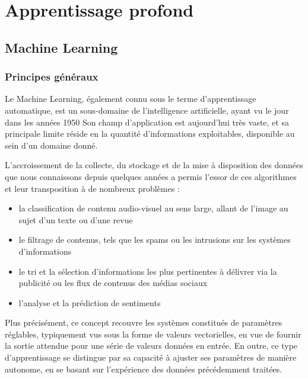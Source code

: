 \documentclass[12pt]{report}
\begin{document}

\tableofcontents
\pagebreak


\chapter{Apprentissage profond}

\section{Machine Learning}

\subsection{Principes généraux}

Le Machine Learning, également connu sous le terme d'apprentissage automatique, est un sous-domaine de l'intelligence artificielle, ayant vu le jour dans
les années 1950\cite{Bib_Marr}\cite{Bib_McCar}
Son champ d'application est aujourd'hui très vaste, et sa principale limite réside en la quantité d'informations exploitables, disponible au sein d'un domaine donné.


L'accroissement de la collecte, du stockage et de la mise à disposition des données que nous connaissons depuis quelques années a permis l'essor de ces algorithmes et leur transposition à de nombreux problèmes :

\begin{itemize}
  \item la classification de contenu audio-visuel au sens large, allant de l'image au sujet d'un texte ou d'une revue
  \item le filtrage de contenus, tels que les spams ou les intrusions sur les systèmes d'informations
  \item le tri et la sélection d'informations les plus pertinentes à délivrer via la publicité ou les flux de contenus des médias sociaux
  \item l'analyse et la prédiction de sentiments
\end{itemize}

Plus précisément, ce concept recouvre les systèmes constitués de paramètres réglables, typiquement vus sous la forme de
valeurs vectorielles, en vue de fournir la sortie attendue pour une série de valeurs données en entrée. En outre, ce type d'apprentissage se distingue
par sa capacité à ajuster ses paramètres de manière autonome, en se basant sur l'expérience des données précédemment traitées.
\end{document}
